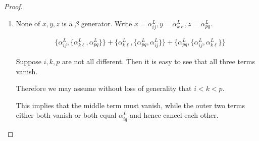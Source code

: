 \documentclass[a4paper,final, reqno]{amsart}
\theoremstyle{plain}
\theoremstyle{definition}
\begin{document}
\begin{proof}
\begin{enumerate}
			\begin{enumerate}
				\item $\{\alpha_{k\ell}^L, \alpha_{pq}^L\} = 0$. 
				
				In this case, the first term vanishes. Furthermore, since $\{\alpha_{pq}^L, \beta_{ij}^L\}$ must be either $0$ or $\alpha_{pq}^L$ the second term will vanish as well. Similarly, the third term must also vanish.
				
				\item $\{\alpha_{k\ell}^L, \alpha_{pq}^L\} = \alpha_{kq}^L$.
				
				This happens when $\ell = p$. 
				
				Let $A=\{i,j\}$, $B=\{k,\ell\}$, $C=\{p,q\}$, $D=\{k,q\}$. 
				
				Now, 
				
				\begin{align*}
					& \{ \beta_{ij}^L, \{\alpha_{k\ell}^L, \alpha_{pq}^L \}\} + \{ \alpha_{k\ell}^L, \{\alpha_{pq}^L, \beta_{ij}^L \}\} + \{\alpha_{pq}^L , \{\beta_{ij}^L, \alpha_{k\ell}^L \}\}  \\
					&= (|A\cap D|_2) \alpha_{kq}^L + (|A\cap C|_2)\alpha_{kq}^L + (|A\cap B|_2) \alpha_{kq}^L \\
					&= \left( |A\cap B|_2 + |A\cap C|_2 + |A\cap D|_2\right) \alpha_{kq}^L
				\end{align*}
				
				where $|\cdot |_2$ denotes cardinality mod 2.
				
				By the inclusion-exclusion principle one may check that 
				\[ |A\cap B|_2 + |A\cap C|_2 + |A\cap D|_2 = 0. \]
				
				
				
								
				\item $\{\alpha_{k\ell}^L, \alpha_{pq}^L\} = \alpha_{p\ell}^L$. 
				
				This is analogous to case (b).
				
				
			\end{enumerate}
			
			\item None of $x,y,z$ is a $\beta$ generator. Write $x = \alpha_{ij}^L, y = \alpha_{k\ell}^L, z=\alpha_{pq}^L$.
			
			\begin{align*}
				& \{ \alpha_{ij}^L, \{\alpha_{k\ell}^L, \alpha_{pq}^L \}\} + \{ \alpha_{k\ell}^L, \{\alpha_{pq}^L, \alpha_{ij}^L \}\} + \{\alpha_{pq}^L , \{\alpha_{ij}^L, \alpha_{k\ell}^L \}\}
			\end{align*}
			
			Suppose $i,k,p$ are not all different. Then it is easy to see that all three terms vanish. 
			
			Therefore we may assume without loss of generality that $i<k<p$. 
			
			This implies that the middle term must vanish, while the outer two terms either both vanish or both equal $\alpha_{iq}^L$ and hence cancel each other.
			
		\end{enumerate}
		
	\end{proof}
	
\end{document}
